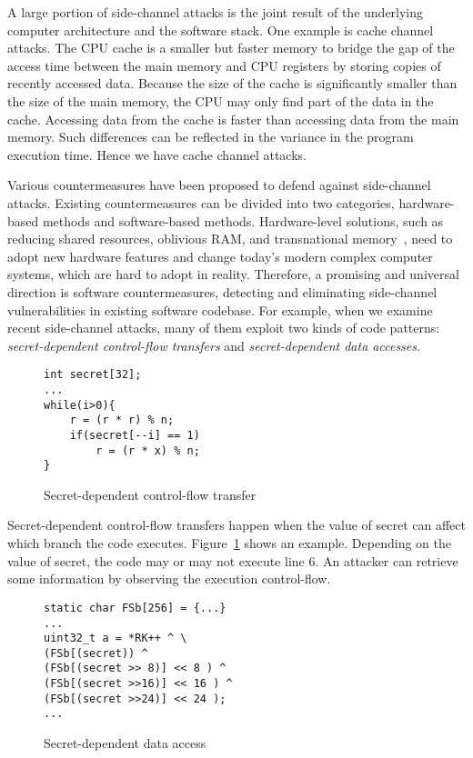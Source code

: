 A large portion of side-channel attacks is the joint result of the underlying computer architecture and the software stack.  One example is cache channel attacks. The CPU cache is a smaller but faster memory to bridge the gap of the access time between the main memory and CPU registers by storing copies of recently accessed data. Because the size of the cache is significantly smaller than the size of the main memory, the CPU may only find part of the data in the cache. Accessing data from the cache is faster than accessing data from the main memory. Such differences can be reflected in the variance in the program execution time. Hence we have cache channel attacks.


Various countermeasures have been proposed to defend against side-channel attacks. Existing countermeasures can be divided into two categories, hardware-based methods and software-based methods. Hardware-level solutions, such as reducing shared resources, oblivious RAM, and transnational memory~\cite{203878,217537,shih2017t,Zhang:2015:HDL:2775054.2694372}, need to adopt new hardware features and change  today's modern complex computer systems, which are hard to adopt in reality. Therefore, a promising and universal direction is software countermeasures, detecting and eliminating side-channel vulnerabilities in existing software codebase. For example, when we examine recent side-channel attacks, many of them exploit two kinds of code patterns: \emph{secret-dependent control-flow transfers} and \emph{secret-dependent data accesses}.
\begin{figure}[h]
    \begin{lstlisting}[xleftmargin=.3\textwidth, xrightmargin=.32\textwidth]
int secret[32];
...
while(i>0){
    r = (r * r) % n;
    if(secret[--i] == 1)
        r = (r * x) % n;   
}
\end{lstlisting}
    \caption{Secret-dependent control-flow transfer}
    \label{fig:secret:cf}
\end{figure}

Secret-dependent control-flow transfers happen when the value of secret can affect which branch the code executes. Figure~\ref{fig:secret:cf} shows an example. Depending on the value of \textsf{secret}, the code may or may not execute line 6. An attacker can retrieve some information by observing the execution control-flow.

\begin{figure}[h]
    \begin{lstlisting}[xleftmargin=.3\textwidth, xrightmargin=.2\textwidth]
static char FSb[256] = {...}
... 
uint32_t a = *RK++ ^ \ 
(FSb[(secret)) ^
(FSb[(secret >> 8)] << 8 ) ^
(FSb[(secret >>16)] << 16 ) ^
(FSb[(secret >>24)] << 24 );
...
\end{lstlisting}
    \caption{Secret-dependent data access}
    \label{fig:secret:da}
\end{figure}

